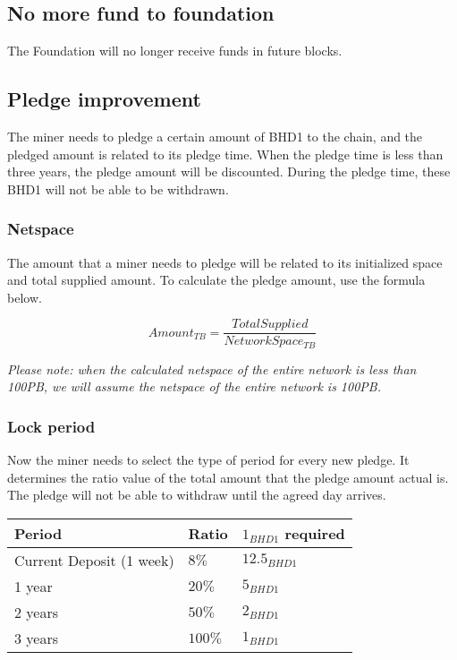 \subsection{No more fund to foundation}
\begin{flushleft}
    The Foundation will no longer receive funds in future blocks.
\end{flushleft}
\subsection{Pledge improvement}
\begin{flushleft}
    The miner needs to pledge a certain amount of BHD1 to the chain, and the pledged amount is related to its pledge time. When the pledge time is less than three years, the pledge amount will be discounted. During the pledge time, these BHD1 will not be able to be withdrawn.
\end{flushleft}
\subsubsection{Netspace}
\begin{flushleft}
    The amount that a miner needs to pledge will be related to its initialized space and total supplied amount. To calculate the pledge amount, use the formula below.
\end{flushleft}
\begin{equation}
    Amount_{TB} = \frac{TotalSupplied}{NetworkSpace_{TB}}
\end{equation}
\begin{flushleft}
    \textit{Please note: when the calculated netspace of the entire network is less than 100PB, we will assume the netspace of the entire network is 100PB.}
\end{flushleft}
\subsubsection{Lock period}
\begin{flushleft}
    Now the miner needs to select the type of period for every new pledge. It determines the ratio value of the total amount that the pledge amount actual is. The pledge will not be able to withdraw until the agreed day arrives.
\end{flushleft}
\begin{tabular}{ |p{5cm}|p{3cm}|p{3.5cm}| }
    \hline
    \rowcolor{lightgray}\textbf{Period} & \textbf{Ratio} & \textbf{$1_{BHD1}$ required} \\[5pt]
    \hline
    Current Deposit (1 week) & $8\%$ & $12.5_{BHD1}$ \\[5pt]
    \rowcolor{lightgray!30} 1 year & $20\%$ & $5_{BHD1}$ \\[5pt]
    2 years & $50\%$ & $2_{BHD1}$ \\[5pt]
    \rowcolor{lightgray!30} 3 years & $100\%$ & $1_{BHD1}$ \\[5pt]
    \hline
\end{tabular}
